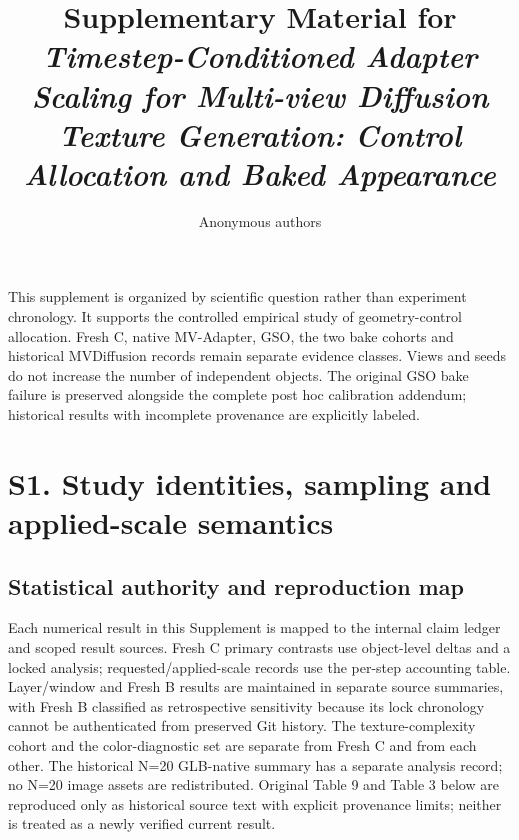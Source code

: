 \documentclass[11pt]{article}
\title{Supplementary Material for\\
\emph{Timestep-Conditioned Adapter Scaling for Multi-view Diffusion Texture Generation: Control Allocation and Baked Appearance}}
\author{Anonymous authors}
\date{}
\begin{document}
\maketitle
\noindent This supplement is organized by scientific question rather than experiment chronology. It supports the controlled empirical study of geometry-control allocation. Fresh C, native MV-Adapter, GSO, the two bake cohorts and historical MVDiffusion records remain separate evidence classes. Views and seeds do not increase the number of independent objects. The original GSO bake failure is preserved alongside the complete post hoc calibration addendum; historical results with incomplete provenance are explicitly labeled.

\tableofcontents
\clearpage
\FloatBarrier
\section*{S1. Study identities, sampling and applied-scale semantics}
\label{supp:group1}

\subsection*{Statistical authority and reproduction map}
Each numerical result in this Supplement is mapped to the internal claim ledger and scoped result sources. Fresh C primary contrasts use object-level deltas and a locked analysis; requested/applied-scale records use the per-step accounting table. Layer/window and Fresh B results are maintained in separate source summaries, with Fresh B classified as retrospective sensitivity because its lock chronology cannot be authenticated from preserved Git history. The texture-complexity cohort and the color-diagnostic set are separate from Fresh C and from each other. The historical N=20 GLB-native summary has a separate analysis record; no N=20 image assets are redistributed. Original Table 9 and Table 3 below are reproduced only as historical source text with explicit provenance limits; neither is treated as a newly verified current result.
\end{document}
